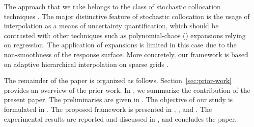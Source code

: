 The approach that we take belongs to the class of stochastic collocation
techniques \cite{xiu2010}. The major distinctive feature of stochastic
collocation is the usage of interpolation as a means of uncertainty
quantification, which should be contrasted with other techniques such as
polynomial-chaos () expansions relying on regression. The application
of  expansions is limited in this case due to the non-smoothness of the
response surface. More concretely, our framework is based on adaptive
hierarchical interpolation on sparse grids \cite{klimke2006, ma2009}.

The remainder of the paper is organized as follows. Section~\ref{sec:prior-work}
provides an overview of the prior work. In , we summarize the
contribution of the present paper. The preliminaries are given in
. The objective of our study is formulated in
. The proposed framework is presented in
, , and . The experimental
results are reported and discussed in , and
 concludes the paper.
